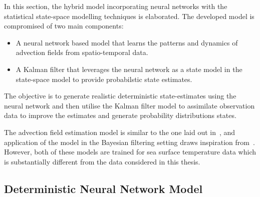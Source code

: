 In this section, the hybrid model incorporating neural networks with the statistical state-space modelling techniques is elaborated.
The developed model is compromised of two main components:
\begin{itemize}
    \item
        A neural network based model that learns the patterns and dynamics of advection fields from spatio-temporal data.
    \item
        A Kalman filter that leverages the neural network as a state model in the state-space model to provide probabilstic state estimates.
\end{itemize}

The objective is to generate realistic deterministic state-estimates using the neural network and then utilise the Kalman filter model to assimilate observation data to improve the estimates and generate probability distributions states.

The advection field estimation model is similar to the one laid out in~\cite{debezenac}, and application of the model in the Bayesian filtering setting draws inspiration from~\cite{deepide}.
However, both of these models are trained for sea surface temperature data which is substantially different from the data considered in this thesis. 

\subsection{Deterministic Neural Network Model}

